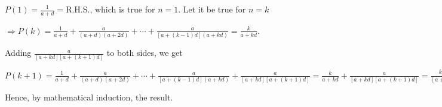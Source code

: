   $P(1) = \frac{1}{a + d} = $R.H.S., which is true for $n = 1$. Let it be true for $n = k$

  $\Rightarrow P(k) = \frac{1}{a + d} + \frac{a}{(a + d)(a + 2d)} + \cdots + \frac{a}{[a + (k - 1)d](a +
    kd)} = \frac{k}{a + kd}$.

  Adding $\frac{a}{[a + kd][a + (k + 1)d]}$ to both sides, we get

  $P(k + 1) = \frac{1}{a + d} + \frac{a}{(a + d)(a + 2d)} + \cdots + \frac{a}{[a + (k - 1)d](a +
    kd)} + \frac{a}{[a + kd][a + (k + 1)d]} = \frac{k}{a + kd} + \frac{a}{[a + kd][a + (k + 1)d]} = \frac{ka
  + k(k + 1)d + a}{[a + kd][a + (k + 1)d]} = \frac{(k + 1)(a + kd)}{[a + kd][a + (k + 1)d]} = \frac{k + 1}{a
  + (k + 1)d} = P(k + 1)$

  Hence, by mathematical induction, the result.
\stopitemize